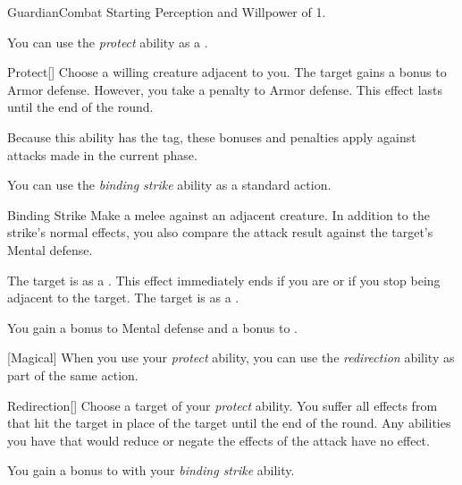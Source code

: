     \begin{feat}{Guardian}{Combat}
        \featpre Starting Perception and Willpower of 1.

         You can use the \textit{protect} ability as a .
        \begin{freeability}{Protect}[]
            Choose a willing creature adjacent to you.
            The target gains a  bonus to Armor defense.
            However, you take a  penalty to Armor defense.
            This effect lasts until the end of the round.

            Because this ability has the  tag, these bonuses and penalties apply against attacks made in the current phase.
        \end{freeability}

         You can use the \textit{binding strike} ability as a standard action.
        \begin{apability}{Binding Strike}
            Make a melee  against an adjacent creature.
            In addition to the strike's normal effects, you also compare the attack result against the target's Mental defense.

            \hit The target is  as a .
            This effect immediately ends if you are  or if you stop being adjacent to the target.
            \crit The target is  as a .
        \end{apability}

         You gain a  bonus to Mental defense and a  bonus to .

        [Magical] When you use your \textit{protect} ability, you can use the \textit{redirection} ability as part of the same action.
        \begin{apability}{Redirection}[]
            Choose a target of your \textit{protect} ability.
            You suffer all effects from  that hit the target in place of the target until the end of the round.
            Any abilities you have that would reduce or negate the effects of the attack have no effect.
        \end{apability}

         You gain a  bonus to  with your \textit{binding strike} ability.


\end{feat}
